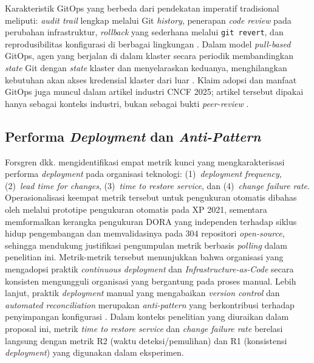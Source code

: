 Karakteristik GitOps yang berbeda dari pendekatan imperatif tradisional meliputi: \textit{audit trail} lengkap melalui Git \textit{history}, penerapan \textit{code review} pada perubahan infrastruktur, \textit{rollback} yang sederhana melalui \texttt{git revert}, dan reprodusibilitas konfigurasi di berbagai lingkungan \citep{yuen2021gitops}. Dalam model \textit{pull-based} GitOps, agen yang berjalan di dalam klaster secara periodik membandingkan \textit{state} Git dengan \textit{state} klaster dan menyelaraskan keduanya, menghilangkan kebutuhan akan akses kredensial klaster dari luar \citep{utami2021analysis}. Klaim adopsi dan manfaat GitOps juga muncul dalam artikel industri CNCF 2025; artikel tersebut dipakai hanya sebagai konteks industri, bukan sebagai bukti \textit{peer-review} \citep{cncf2025gitops}.

\subsection{Performa \textit{Deployment} dan \textit{Anti-Pattern}}

Forsgren dkk. \citep{forsgren2018accelerate} mengidentifikasi empat metrik kunci yang mengkarakterisasi performa \textit{deployment} pada organisasi teknologi: (1)~\textit{deployment frequency}, (2)~\textit{lead time for changes}, (3)~\textit{time to restore service}, dan (4)~\textit{change failure rate}. Operasionalisasi keempat metrik tersebut untuk pengukuran otomatis dibahas oleh \citet{sallin2021measuring} melalui prototipe pengukuran otomatis pada XP 2021, sementara \citet{wilkes2023framework} memformalkan kerangka pengukuran DORA yang independen terhadap siklus hidup pengembangan dan memvalidasinya pada 304 repositori \textit{open-source}, sehingga mendukung justifikasi pengumpulan metrik berbasis \textit{polling} dalam penelitian ini. Metrik-metrik tersebut menunjukkan bahwa organisasi yang mengadopsi praktik \textit{continuous deployment} dan \textit{Infrastructure-as-Code} secara konsisten mengungguli organisasi yang bergantung pada proses manual. Lebih lanjut, praktik \textit{deployment} manual yang mengabaikan \textit{version control} dan \textit{automated reconciliation} merupakan \textit{anti-pattern} yang berkontribusi terhadap penyimpangan konfigurasi \citep{beyer2016sre}. Dalam konteks penelitian yang diuraikan dalam proposal ini, metrik \textit{time to restore service} dan \textit{change failure rate} berelasi langsung dengan metrik R2 (waktu deteksi/pemulihan) dan R1 (konsistensi \textit{deployment}) yang digunakan dalam eksperimen.

